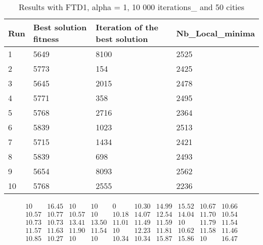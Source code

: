\documentclass[12pt,oneside,a4paper]{article}
\begin{document}
\begin{table}[h]
  \centering
  \small
  \begin{tabular}{llll}
    \hline
    \multicolumn{1}{|l|}{\textbf{Run}}& \multicolumn{1}{l|}{\textbf{Best solution fitness}}& \multicolumn{1}{l|}{\textbf{Iteration of the best solution}}& \multicolumn{1}{l|}{\textbf{Nb\_Local\_minima}}\\ \hline
    \multicolumn{1}{|l|}{1} & \multicolumn{1}{l|}{5649}  & \multicolumn{1}{l|}{8100} & \multicolumn{1}{l|}{2525}  \\ \hline
    \multicolumn{1}{|l|}{2} & \multicolumn{1}{l|}{5773}  & \multicolumn{1}{l|}{154} & \multicolumn{1}{l|}{2425}  \\ \hline
    \multicolumn{1}{|l|}{3} & \multicolumn{1}{l|}{5645}  & \multicolumn{1}{l|}{2015}  & \multicolumn{1}{l|}{2478}  \\ \hline
    \multicolumn{1}{|l|}{4} & \multicolumn{1}{l|}{5771}  & \multicolumn{1}{l|}{358}  & \multicolumn{1}{l|}{2495}  \\ \hline
    \multicolumn{1}{|l|}{5} & \multicolumn{1}{l|}{5768}  & \multicolumn{1}{l|}{2716}  & \multicolumn{1}{l|}{2364}  \\ \hline
    \multicolumn{1}{|l|}{6} & \multicolumn{1}{l|}{5839}  & \multicolumn{1}{l|}{1023}  & \multicolumn{1}{l|}{2513}  \\ \hline
    \multicolumn{1}{|l|}{7} & \multicolumn{1}{l|}{5715}  & \multicolumn{1}{l|}{1434}  & \multicolumn{1}{l|}{2421}  \\ \hline
    \multicolumn{1}{|l|}{8} & \multicolumn{1}{l|}{5839}  & \multicolumn{1}{l|}{698} & \multicolumn{1}{l|}{2493}  \\ \hline
    \multicolumn{1}{|l|}{9} & \multicolumn{1}{l|}{5654}  & \multicolumn{1}{l|}{8093} & \multicolumn{1}{l|}{2562}  \\ \hline
    \multicolumn{1}{|l|}{10} & \multicolumn{1}{l|}{5768}  & \multicolumn{1}{l|}{2555} & \multicolumn{1}{l|}{2236}  \\ \hline
  \end{tabular}
  \caption{Results with FTD1, alpha = 1, 10 000 iterations\_ and 50 cities}
\end{table}

\begin{equation}
  \tag{Mean Tabu Duration for each city (alpha = 1 and 50 cities)}
  \begin{smallmatrix} 10 & 16.45 & 10 & 10 & 0 & 10.30 & 14.99 & 15.52 & 10.67 & 10.66 \\
                  10.57 & 10.77 & 10.57 & 10 & 10.18 & 14.07 & 12.54 & 14.04 & 11.70 & 10.54 \\
                  10.73 & 10.73 & 13.41 & 13.50 & 11.01 & 11.49 & 11.59 & 10 & 11.79 & 11.54 \\
                  11.57 & 11.63 & 11.90 & 11.54 & 10 & 12.23 & 11.81 & 10.62 & 11.58 & 11.46 \\
                  10.85 & 10.27 & 10 & 10 & 10.34 & 10.34 & 15.87 & 15.86 & 10 & 16.47
  \end{smallmatrix}
\end{equation}
\end{document}
